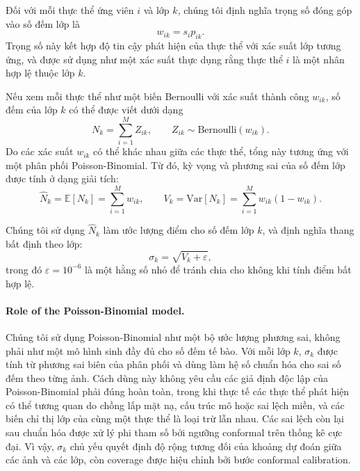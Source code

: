 \documentclass[pdflatex,sn-mathphys-num]{sn-jnl}
\begin{document}
Đối với mỗi thực thể ứng viên \(i\) và lớp \(k\), chúng tôi định nghĩa trọng số
đóng góp vào số đếm lớp là
\begin{equation}
w_{ik}=s_i p_{ik}.
\end{equation}
Trọng số này kết hợp độ tin cậy phát hiện của thực thể với xác suất lớp tương ứng,
và được sử dụng như một xác suất thực dụng rằng thực thể \(i\) là một nhân hợp lệ
thuộc lớp \(k\).

Nếu xem mỗi thực thể như một biến Bernoulli với xác suất thành công \(w_{ik}\), số
đếm của lớp \(k\) có thể được viết dưới dạng
\begin{equation}
N_k = \sum_{i=1}^{M} Z_{ik}, \qquad Z_{ik}\sim \mathrm{Bernoulli}(w_{ik}).
\end{equation}
Do các xác suất \(w_{ik}\) có thể khác nhau giữa các thực thể, tổng này tương ứng với
một phân phối Poisson-Binomial. Từ đó, kỳ vọng và phương sai của số đếm lớp được tính
ở dạng giải tích:
\begin{equation}
\hat{N}_k = \mathbb{E}[N_k] = \sum_{i=1}^{M} w_{ik},
\qquad
V_k = \mathrm{Var}[N_k] = \sum_{i=1}^{M} w_{ik}(1-w_{ik}).
\end{equation}

Chúng tôi sử dụng \(\hat{N}_k\) làm ước lượng điểm cho số đếm lớp \(k\), và định nghĩa
thang bất định theo lớp:
\begin{equation}
\sigma_k = \sqrt{V_k+\varepsilon},
\end{equation}
trong đó \(\varepsilon=10^{-6}\) là một hằng số nhỏ để tránh chia cho không khi tính
điểm bất hợp lệ.

\paragraph{Role of the Poisson-Binomial model.}
Chúng tôi sử dụng Poisson-Binomial như một bộ ước lượng phương sai, không phải như một
mô hình sinh đầy đủ cho số đếm tế bào. Với mỗi lớp \(k\), \(\sigma_k\) được tính từ
phương sai biên của phân phối và dùng làm hệ số chuẩn hóa cho sai số đếm theo từng ảnh.
Cách dùng này không yêu cầu các giả định độc lập của Poisson-Binomial phải đúng hoàn
toàn, trong khi thực tế các thực thể phát hiện có thể tương quan do chồng lấp mặt nạ,
cấu trúc mô hoặc sai lệch miền, và các biến chỉ thị lớp của cùng một thực thể là loại
trừ lẫn nhau. Các sai lệch còn lại sau chuẩn hóa được xử lý phi tham số bởi ngưỡng
conformal trên thống kê cực đại. Vì vậy, \(\sigma_k\) chủ yếu quyết định độ rộng tương
đối của khoảng dự đoán giữa các ảnh và các lớp, còn coverage được hiệu chỉnh bởi bước
conformal calibration.
\end{document}
